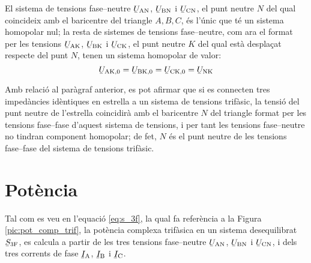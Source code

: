 El sistema de tensions fase--neutre
$\cmplx{U}\ped{AN}$, $\cmplx{U}\ped{BN}$ i $\cmplx{U}\ped{CN}$,
el punt neutre $N$ del qual coincideix amb el baricentre del
triangle $A, B,
 C$, \'{e}s l'\'{u}nic que t\'{e} un sistema homopolar nul; la resta de sistemes de tensions
 fase--neutre, com ara el format per les tensions $\cmplx{U}\ped{AK}$, $\cmplx{U}\ped{BK}$ i $\cmplx{U}\ped{CK}$,
 el punt neutre $K$ del qual est\`{a} despla\c{c}at respecte del punt $N$, tenen un sistema
 homopolar de valor:
\begin{equation}
    \cmplx{U}\ped{AK,0} = \cmplx{U}\ped{BK,0} =
    \cmplx{U}\ped{CK,0} = \cmplx{U}\ped{NK}
\end{equation}

Amb relaci\'{o} al par\`{a}graf anterior, es pot afirmar que si es
connecten tres imped\`{a}ncies id\`{e}ntiques en estrella a un sistema
de tensions trif\`{a}sic, la tensi\'{o} del punt neutre de l'estrella
coincidir\`{a} amb el baricentre $N$ del triangle format per les tensions
fase--fase d'aquest sistema de tensions, i per tant les tensions fase--neutre no tindran
component homopolar; de fet, $N$ \'{e}s el punt neutre de les tensions
fase--fase del sistema de tensions trif\`{a}sic.

\section{Pot\`{e}ncia} 

Tal com es veu en l'equaci\'{o} \eqref{eq:s_3f}, la qual fa refer\`{e}ncia a
la Figura \vref{pic:pot_comp_trif}, la pot\`{e}ncia complexa trif\`{a}sica
en un sistema desequilibrat $\cmplx{S}\ped{3F}$, es calcula a partir
de les tres tensions fase--neutre $\cmplx{U}\ped{AN}$,
$\cmplx{U}\ped{BN}$ i $\cmplx{U}\ped{CN}$, i dels tres
corrents de fase $\cmplx{I}\ped{A}$, $\cmplx{I}\ped{B}$ i
$\cmplx{I}\ped{C}$.


